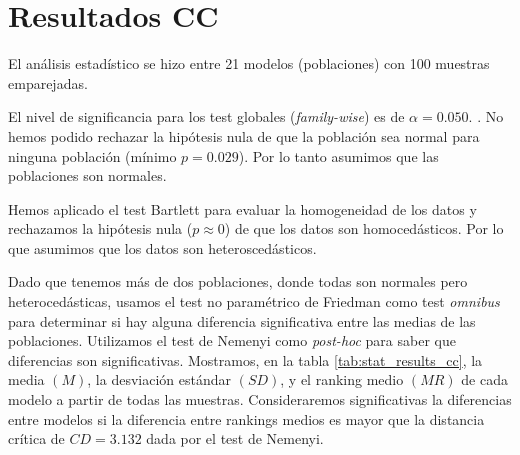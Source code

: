 \documentclass[a4paper,oneside,11pt,leqno]{article}
\begin{document}
	
	\section{Resultados CC}
	\label{sec:results_cc}
	
	El análisis estadístico se hizo entre 21 modelos (poblaciones) con 100 muestras emparejadas.
	
	El nivel de significancia para los test globales (\textit{family-wise}) es de $\alpha=0.050$.
.
	No hemos podido rechazar la hipótesis nula de que la población sea normal para ninguna población (mínimo $p=0.029$). Por lo tanto asumimos que las poblaciones son normales.
	
	Hemos aplicado el test Bartlett para evaluar la homogeneidad de los datos y rechazamos la hipótesis nula ($p\approx 0$) de que los datos son homocedásticos. Por lo que asumimos que los datos son heteroscedásticos.
	
	Dado que tenemos más de dos poblaciones, donde todas son normales pero heterocedásticas, usamos el test no paramétrico de Friedman como test \textit{omnibus} para determinar si hay alguna diferencia significativa entre las medias de las poblaciones. Utilizamos el test de Nemenyi como \textit{post-hoc} para saber que diferencias son significativas. Mostramos, en la tabla \ref{tab:stat_results_cc}, la media $(M)$, la desviación estándar $(SD)$, y el ranking medio $(MR)$ de cada modelo a partir de todas las muestras. Consideraremos significativas la diferencias entre modelos si la diferencia entre rankings medios es mayor que la distancia crítica de $CD=3.132$ dada por el test de Nemenyi.
	
\end{document}
